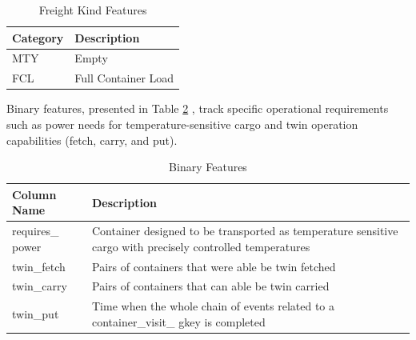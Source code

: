 		\begin{table}[H]
			\centering
			\begin{tabular}{p{}p{}}
				\hline
				\textbf{Category} & \textbf{Description} \\
				\hline
				MTY                   & Empty                \\
				\hline
				FCL                   & Full Container Load  \\
				\hline
			\end{tabular}
			\caption{Freight Kind Features}
			\label{tab:freight_kind}
		\end{table}

		Binary features, presented in Table \ref{tab:binary_features}
		, track specific operational requirements such as power needs for temperature-sensitive cargo and twin
		operation capabilities (fetch, carry, and put).

		\begin{table}[H]
			\centering
			\begin{tabular}{p{}p{}}
				\hline
				\textbf{Column Name} & \textbf{Description}
				\\
				\hline
				requires\_
				power & Container designed to be transported as temperature sensitive cargo with precisely
				controlled temperatures \\
				\hline
				twin\_fetch & Pairs of containers that were able be twin fetched
				\\
				\hline
				twin\_carry & Pairs of containers that can able be twin carried
				\\
				\hline
				twin\_put & Time when the whole chain of events related to a container\_visit\_
				gkey is completed \\
				\hline
			\end{tabular}
			\caption{Binary Features}
			\label{tab:binary_features}
		\end{table}

